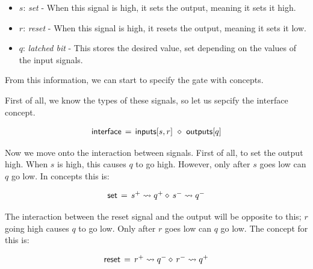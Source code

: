 \documentclass[british, journal]{IEEEtran}
\begin{document}
\begin{itemize}
  \item $s$: \emph{set} - When this signal is high, it sets the output, meaning it sets it high.
  \item $r$: \emph{reset} - When this signal is high, it resets the output, meaning it sets it low.
  \item $q$: \emph{latched bit} - This stores the desired value, set depending on the values of the input signals.
\end{itemize}

\noindent From this information, we can start to specify the gate with concepts.

First of all, we know the types of these signals, so let us sepcify the interface concept.

\vspace{-2mm}

\[
\begin{array}{lcl}
\mathsf{interface}&\hspace{-2mm}=&\hspace{-2mm}\mathsf{inputs}[s, r]~\diamond~\mathsf{outputs}[q]
\end{array}
\]

\noindent Now we move onto the interaction between signals. First of all, to set the output high.
When $s$ is high, this causes $q$ to go high. However, only after $s$ goes low can $q$ go low.
In concepts this is: 

\vspace{-3mm}

\[
\begin{array}{lcl}
\mathsf{set}&\hspace{-2mm}=&\hspace{-2mm}s^{+} \rightsquigarrow q^{+} \diamond\, s^{-} \rightsquigarrow q^{-}
\end{array}
\]

\noindent The interaction between the reset signal and the output will be opposite to this; $r$ going high causes $q$ 
to go low. Only after $r$ goes low can $q$ go low. The concept for this is:

\vspace{-2mm}
\[
\begin{array}{lcl}
\mathsf{reset}&\hspace{-2mm}=&\hspace{-2mm}r^{+} \rightsquigarrow q^{-} \diamond\, r^{-} \rightsquigarrow q^{+}
\end{array}
\]
\end{document}
